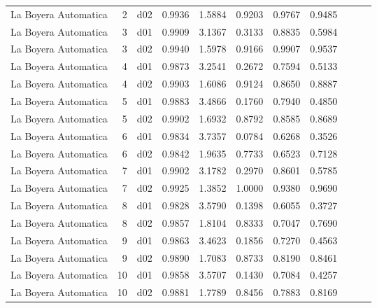 \begin{landscape}
\begin{longtable}{p{2cm}rrrrrrrrrr}
 La Boyera Automatica  &          2 &     d02 &   0.9936 &  1.5884 &        0.9203 &           0.9767 &  0.9485 \\
 La Boyera Automatica  &          3 &     d01 &   0.9909 &  3.1367 &        0.3133 &           0.8835 &  0.5984 \\
 La Boyera Automatica  &          3 &     d02 &   0.9940 &  1.5978 &        0.9166 &           0.9907 &  0.9537 \\
 La Boyera Automatica  &          4 &     d01 &   0.9873 &  3.2541 &        0.2672 &           0.7594 &  0.5133 \\
 La Boyera Automatica  &          4 &     d02 &   0.9903 &  1.6086 &        0.9124 &           0.8650 &  0.8887 \\
 La Boyera Automatica  &          5 &     d01 &   0.9883 &  3.4866 &        0.1760 &           0.7940 &  0.4850 \\
 La Boyera Automatica  &          5 &     d02 &   0.9902 &  1.6932 &        0.8792 &           0.8585 &  0.8689 \\
 La Boyera Automatica  &          6 &     d01 &   0.9834 &  3.7357 &        0.0784 &           0.6268 &  0.3526 \\
 La Boyera Automatica  &          6 &     d02 &   0.9842 &  1.9635 &        0.7733 &           0.6523 &  0.7128 \\
 La Boyera Automatica  &          7 &     d01 &   0.9902 &  3.1782 &        0.2970 &           0.8601 &  0.5785 \\
 La Boyera Automatica  &          7 &     d02 &   0.9925 &  1.3852 &        1.0000 &           0.9380 &  0.9690 \\
 La Boyera Automatica  &          8 &     d01 &   0.9828 &  3.5790 &        0.1398 &           0.6055 &  0.3727 \\
 La Boyera Automatica  &          8 &     d02 &   0.9857 &  1.8104 &        0.8333 &           0.7047 &  0.7690 \\
 La Boyera Automatica  &          9 &     d01 &   0.9863 &  3.4623 &        0.1856 &           0.7270 &  0.4563 \\
 La Boyera Automatica  &          9 &     d02 &   0.9890 &  1.7083 &        0.8733 &           0.8190 &  0.8461 \\
 La Boyera Automatica  &         10 &     d01 &   0.9858 &  3.5707 &        0.1430 &           0.7084 &  0.4257 \\
 La Boyera Automatica  &         10 &     d02 &   0.9881 &  1.7789 &        0.8456 &           0.7883 &  0.8169 \\

\end{longtable}
\end{landscape}
